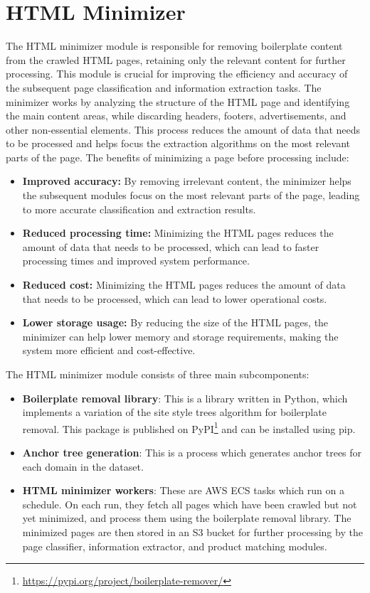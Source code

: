 \section{HTML Minimizer}\label{sec:html_minimizer}

The HTML minimizer module is responsible for removing boilerplate content from the crawled HTML pages, retaining only the relevant content for further processing.
This module is crucial for improving the efficiency and accuracy of the subsequent page classification and information extraction tasks.
The minimizer works by analyzing the structure of the HTML page and identifying the main content areas, while discarding headers, footers, advertisements, and other non-essential elements.
This process reduces the amount of data that needs to be processed and helps focus the extraction algorithms on the most relevant parts of the page.
The benefits of minimizing a page before processing include:
\begin{itemize}
    \item \textbf{Improved accuracy:} By removing irrelevant content, the minimizer helps the subsequent modules focus on the most relevant parts of the page, leading to more accurate classification and extraction results.
    \item \textbf{Reduced processing time:} Minimizing the HTML pages reduces the amount of data that needs to be processed, which can lead to faster processing times and improved system performance.
    \item \textbf{Reduced cost:} Minimizing the HTML pages reduces the amount of data that needs to be processed, which can lead to lower operational costs.
    \item \textbf{Lower storage usage:} By reducing the size of the HTML pages, the minimizer can help lower memory and storage requirements, making the system more efficient and cost-effective.
\end{itemize}

The HTML minimizer module consists of three main subcomponents:
\begin{itemize}
    \item \textbf{Boilerplate removal library}: This is a library written in Python, which implements a variation of the site style trees algorithm for boilerplate removal.
    This package is published on PyPI\footnote{\url{https://pypi.org/project/boilerplate-remover/}} and can be installed using pip.
    \item \textbf{Anchor tree generation}: This is a process which generates anchor trees for each domain in the dataset.
    \item \textbf{HTML minimizer workers}: These are AWS ECS tasks which run on a schedule.
    On each run, they fetch all pages which have been crawled but not yet minimized, and process them using the boilerplate removal library.
    The minimized pages are then stored in an S3 bucket for further processing by the page classifier, information extractor, and product matching modules.
\end{itemize}

